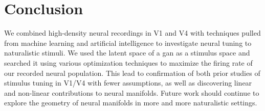 \section{Conclusion}
\glsresetall
We combined high-density neural recordings in V1 and V4 with techniques pulled from machine learning and artificial intelligence to investigate neural tuning to naturalistic stimuli. We used the latent space of a
\gls{gan} as a stimulus space and searched it using various optimization techniques to maximize the firing rate of our recorded neural population. This lead to confirmation of both prior studies of stimulus tuning in V1/V4 with fewer assumptions, as well as discovering linear and non-linear contributions to neural manifolds. Future work should continue to explore the geometry of neural manifolds in more and more naturalistic settings.






 